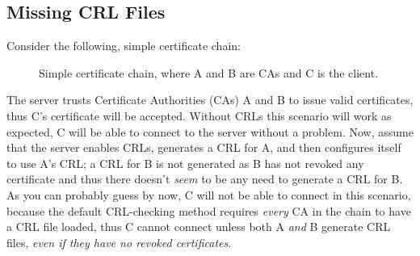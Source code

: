 \documentclass{article}
\begin{document}
\subsection{Missing CRL Files}
Consider\label{2017-09-22-missing-crls} the following, simple certificate chain:
\begin{center}
\begin{figure}
\begin{makeimage}
\end{makeimage}
\caption{Simple certificate chain, where A and B are CAs and C is the client.}
\end{figure}
\end{center}
The server trusts Certificate Authorities (CAs) A and B to issue valid certificates, thus C's certificate will be accepted.  Without CRLs this scenario will work as expected, C will be able to connect to the server without a problem.  Now, assume that the server enables CRLs, generates a CRL for A, and then configures itself to use A's CRL; a CRL for B is not generated as B has not revoked any certificate and thus there doesn't \emph{seem} to be any need to generate a CRL for B.  As you can probably guess by now, C will not be able to connect in this scenario, because the default CRL-checking method requires \emph{every} CA in the chain to have a CRL file loaded, thus C cannot connect unless both A \emph{and} B generate CRL files, \emph{even if they have no revoked certificates}.
\end{document}
